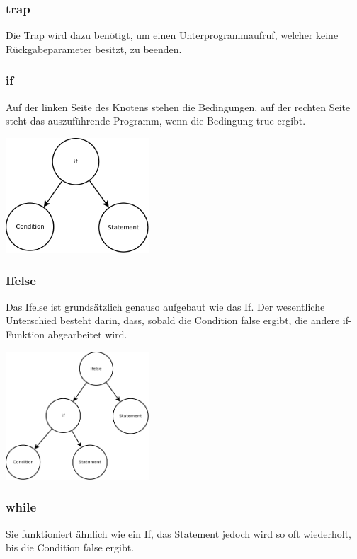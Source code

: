\subsubsection{trap}
Die Trap wird dazu benötigt, um einen Unterprogrammaufruf, welcher keine Rückgabeparameter besitzt, zu beenden.

\subsubsection{if}
Auf der linken Seite des Knotens stehen die Bedingungen, auf der rechten Seite steht das auszuführende Programm, wenn die Bedingung
true ergibt.

\includegraphics[width=0.4\textwidth]{./media/images/interpreter/syntaxbaum/statements/if.png}

\subsubsection{Ifelse}
Das Ifelse ist grundsätzlich genauso aufgebaut wie das If. Der wesentliche Unterschied besteht darin, dass, sobald die Condition
false ergibt, die andere if-Funktion abgearbeitet wird.

\includegraphics[width=0.4\textwidth]{./media/images/interpreter/syntaxbaum/statements/ifelse.png}

\subsubsection{while}
Sie funktioniert ähnlich wie ein If, das Statement jedoch wird so oft wiederholt, bis die Condition false ergibt.


